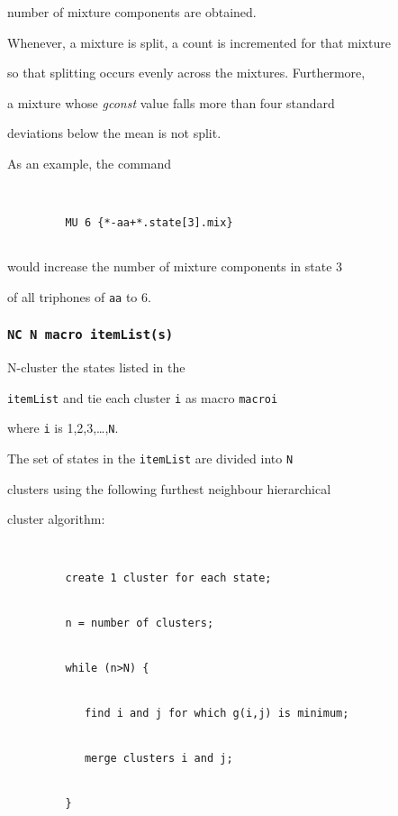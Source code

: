 number of mixture components are obtained.


Whenever, a mixture is split, a count is incremented  for that mixture


so that splitting occurs evenly across the mixtures.  Furthermore,


a mixture whose {\it gconst} value falls more than four standard


deviations below the mean is not split.





As an example, the command


\begin{verbatim}


         MU 6 {*-aa+*.state[3].mix}


\end{verbatim}


would increase the number of mixture components in state 3


of all triphones of \texttt{aa} to 6.





\subsubsection*{\tt NC N macro itemList(s)}





N-cluster the states listed in the 


\texttt{itemList} and tie each cluster \texttt{i} as macro \texttt{macroi}


where \texttt{i} is 1,2,3,\ldots,\texttt{N}.


The set of states in the \texttt{itemList} are divided into \texttt{N}


clusters using the following furthest neighbour hierarchical


cluster algorithm:


\begin{verbatim}


         create 1 cluster for each state;


         n = number of clusters;


         while (n>N) {


            find i and j for which g(i,j) is minimum;


            merge clusters i and j;


         }


\end{verbatim}


